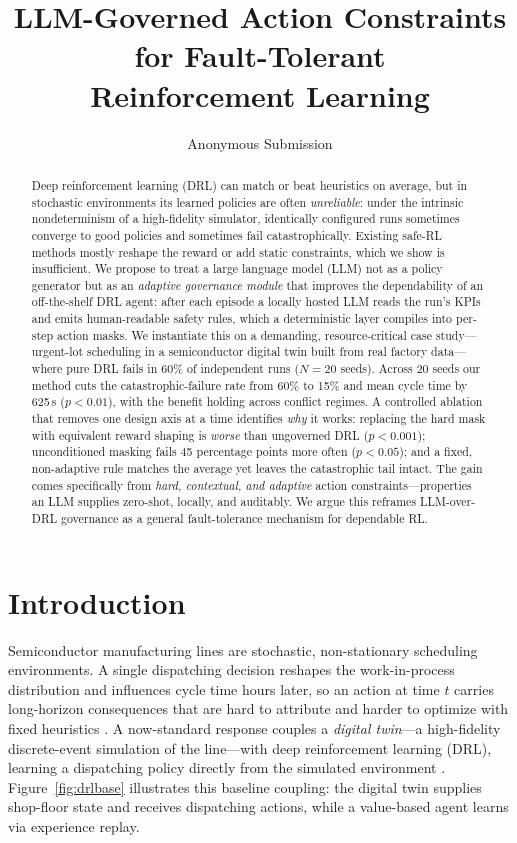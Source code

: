 \documentclass[letterpaper]{article} %
\title{LLM-Governed Action Constraints for Fault-Tolerant\\
Reinforcement Learning}
\author{
    Anonymous Submission
}
\begin{document}
\maketitle

\begin{abstract}
Deep reinforcement learning (DRL) can match or beat heuristics on average, but in
stochastic environments its learned policies are often \emph{unreliable}: under
the intrinsic nondeterminism of a high-fidelity simulator, identically configured
runs sometimes converge to good policies and sometimes fail catastrophically.
Existing safe-RL methods mostly reshape the reward or add static constraints,
which we show is insufficient. We propose to treat a large language model (LLM)
not as a policy generator but as an \emph{adaptive governance module} that
improves the dependability of an off-the-shelf DRL agent: after each episode a
locally hosted LLM reads the run's KPIs and emits human-readable safety rules,
which a deterministic layer compiles into per-step action masks. We instantiate
this on a demanding, resource-critical case study---urgent-lot scheduling in a
semiconductor digital twin built from real factory data---where pure DRL fails in
60\% of independent runs ($N{=}20$ seeds). Across 20 seeds our method cuts the
catastrophic-failure rate from 60\% to 15\% and mean cycle time by 625\,s
($p{<}0.01$), with the benefit holding across conflict regimes. A controlled
ablation that removes one design axis at a time identifies \emph{why} it works:
replacing the hard mask with equivalent reward shaping is \emph{worse} than
ungoverned DRL ($p{<}0.001$); unconditioned masking fails 45 percentage points
more often ($p{<}0.05$); and a fixed, non-adaptive rule matches the average yet
leaves the catastrophic tail intact. The gain comes specifically from
\emph{hard, contextual, and adaptive} action constraints---properties an LLM
supplies zero-shot, locally, and auditably. We argue this reframes LLM-over-DRL
governance as a general fault-tolerance mechanism for dependable RL.
\end{abstract}

\section{Introduction}

Semiconductor manufacturing lines are stochastic, non-stationary scheduling
environments. A single dispatching decision reshapes the work-in-process
distribution and influences cycle time hours later, so an action at time $t$
carries long-horizon consequences that are hard to attribute and harder to
optimize with fixed heuristics \citep{moyne2017,hu2019}. A now-standard response
couples a \emph{digital twin}---a high-fidelity discrete-event simulation of the
line---with deep reinforcement learning (DRL), learning a dispatching policy
directly from the simulated environment \citep{waschneck2018,lee2025}.
Figure~\ref{fig:drlbase} illustrates this baseline coupling: the digital twin
supplies shop-floor state and receives dispatching actions, while a value-based
agent learns via experience replay.
\end{document}
